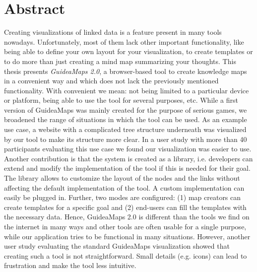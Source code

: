 \section*{Abstract}%

Creating visualizations of linked data is a feature present in many tools nowadays. Unfortunately, most of them lack other important functionality, like being able to define your own layout for your visualization, to create templates or to do more than just creating a mind map summarizing your thoughts. This thesis presents \textit{GuideaMaps 2.0}, a browser-based tool to create knowledge maps in a convenient way and which does not lack the previously mentioned functionality. With convenient we mean: not being limited to a particular device or platform, being able to use the tool for several purposes, etc. While a first version of GuideaMaps was mainly created for the purpose of serious games, we broadened the range of situations in which the tool can be used. As an example use case, a website with a complicated tree structure underneath was visualized by our tool to make its structure more clear. In a user study with more than 40 participants evaluating this use case we found our visualization was easier to use.\\

Another contribution is that the system is created as a library, i.e. developers can extend and modify the implementation of the tool if this is needed for their goal. The library allows to customize the layout of the nodes and the links without affecting the default implementation of the tool. A custom implementation can easily be plugged in. Further, two modes are configured: (1) map creators can create templates for a specific goal and (2) end-users can fill the templates with the necessary data. Hence, GuideaMaps 2.0 is different than the tools we find on the internet in many ways and other tools are often usable for a single purpose, while our application tries to be functional in many situations. However, another user study evaluating the standard GuideaMaps visualization showed that creating such a tool is not straightforward. Small details (e.g. icons) can lead to frustration and make the tool less intuitive.